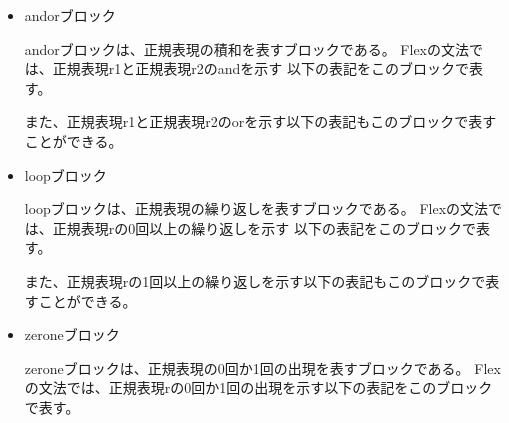 \documentclass{risepaper}
\begin{document}
\begin{itemize}
\begin{itemize}
\end{itemize}

\begin{itemize}
\item andorブロック

andorブロックは、正規表現の積和を表すブロックである。
Flexの文法では、正規表現r1と正規表現r2のandを示す
以下の表記をこのブロックで表す。


また、正規表現r1と正規表現r2のorを示す以下の表記もこのブロックで表すことができる。


\end{itemize}

\begin{itemize}
\item loopブロック

loopブロックは、正規表現の繰り返しを表すブロックである。
Flexの文法では、正規表現rの0回以上の繰り返しを示す
以下の表記をこのブロックで表す。


また、正規表現rの1回以上の繰り返しを示す以下の表記もこのブロックで表すことができる。


\end{itemize}

\begin{itemize}
\item zeroneブロック

zeroneブロックは、正規表現の0回か1回の出現を表すブロックである。
Flexの文法では、正規表現rの0回か1回の出現を示す以下の表記をこのブロックで表す。


\end{itemize}
\end{itemize}
\end{document}
